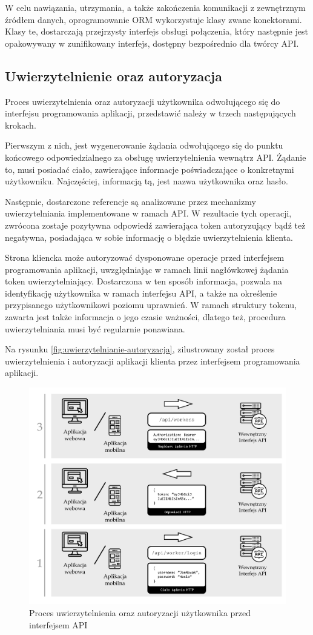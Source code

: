 W celu nawiązania, utrzymania, a także zakończenia komunikacji z zewnętrznym źródłem danych, oprogramowanie ORM wykorzystuje klasy zwane konektorami. Klasy te, dostarczają przejrzysty interfejs obsługi połączenia, który następnie jest opakowywany w zunifikowany interfejs, dostępny bezpośrednio dla twórcy API.

\subsection*{Uwierzytelnienie oraz autoryzacja}
Proces uwierzytelnienia oraz autoryzacji użytkownika odwołującego się do interfejsu programowania aplikacji, przedstawić należy w trzech następujących krokach.

Pierwszym z nich, jest wygenerowanie żądania odwołującego się do punktu końcowego odpowiedzialnego za obsługę uwierzytelnienia wewnątrz API. Żądanie to, musi posiadać ciało, zawierające informacje poświadczające o konkretnymi użytkowniku. Najczęściej, informacją tą, jest nazwa użytkownika oraz hasło.

Następnie, dostarczone referencje są analizowane przez mechanizmy uwierzytelniania implementowane w ramach API. W rezultacie tych operacji, zwrócona zostaje pozytywna odpowiedź zawierająca token autoryzujący bądź też negatywna, posiadająca w sobie informację o błędzie uwierzytelnienia klienta.

Strona kliencka może autoryzować dysponowane operacje przed interfejsem programowania aplikacji, uwzględniając w ramach linii nagłówkowej żądania token uwierzytelniający. Dostarczona w ten sposób informacja, pozwala na identyfikację użytkownika w ramach interfejsu API, a także na określenie przypisanego użytkownikowi poziomu uprawnień. W ramach struktury tokenu, zawarta jest także informacja o jego czasie ważności, dlatego też, procedura uwierzytelniania musi być regularnie ponawiana.

Na rysunku \ref{fig:uwierzytelnianie-autoryzacja}, zilustrowany został proces uwierzytelnienia i autoryzacji aplikacji klienta przez interfejsem programowania aplikacji. 

\begin{figure}[ht]
 \centering
  \includegraphics[width=0.6\linewidth]{rys03/uwierzytelnianie-autoryzacja}
 \caption{Proces uwierzytelnienia oraz autoryzacji użytkownika przed interfejsem API}
 \label{fig:uwierzytelnienie-autoryzacja}
\end{figure}


